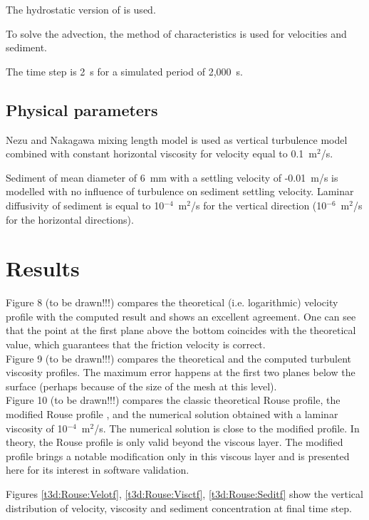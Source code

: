 The hydrostatic version of  is used.

To solve the advection, the method of characteristics is used for velocities
and sediment.

The time step is 2~s for a simulated period of 2,000~s.

\subsection{Physical parameters}

Nezu and Nakagawa mixing length model is used as vertical turbulence model
combined with constant horizontal viscosity for velocity equal to 0.1~m$^2$/s.

Sediment of mean diameter of 6~mm with a settling velocity of -0.01~m/s
is modelled with no influence of turbulence on sediment settling velocity.
Laminar diffusivity of sediment is equal to 10$^{-4}$~m$^2$/s for the vertical
direction (10$^{-6}$~m$^2$/s for the horizontal directions).

\section{Results}

Figure 8 (to be drawn!!!) compares the theoretical \cite{HervouetVillaret_2004}
(i.e. logarithmic) velocity
profile with the computed result and shows an excellent agreement.
One can see that the point at the first plane above the bottom coincides
with the theoretical value, which guarantees that the friction velocity
is correct.\\
Figure 9 (to be drawn!!!) compares the theoretical \cite{HervouetVillaret_2004}
and the computed turbulent
viscosity profiles.
The maximum error happens at the first two planes below the surface
(perhaps because of the size of the mesh at this level).\\
Figure 10 (to be drawn!!!) compares the classic theoretical Rouse profile, the
modified Rouse profile \cite{HervouetVillaret_2004},
and the numerical solution obtained with a
laminar viscosity of 10$^{-4}$~m$^2$/s.
The numerical solution is close to the modified profile.
In theory, the Rouse profile is only valid beyond the viscous layer.
The modified profile brings a notable modification only in this viscous
layer and is presented here for its interest in software validation.

Figures \ref{t3d:Rouse:Velotf}, \ref{t3d:Rouse:Visctf}, \ref{t3d:Rouse:Seditf}
show the vertical distribution of velocity, viscosity and sediment concentration
at final time step.

